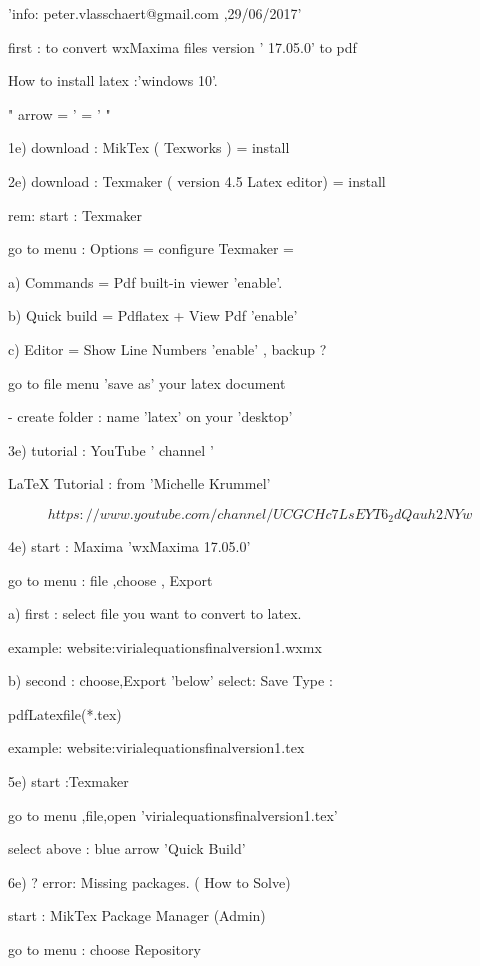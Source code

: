 \documentclass[12pt]{article}
\begin{document}
'info: peter.vlasschaert@gmail.com ,29/06/2017'

first : to convert wxMaxima files version ' 17.05.0' to pdf 

How to install latex :'windows 10'.

 "  arrow =  ' = '  "

1e) download : MikTex   ( Texworks ) = install

2e) download : Texmaker ( version 4.5 Latex editor) = install

rem: start : Texmaker  

     go to menu : Options = configure Texmaker = 
      
     a) Commands    = Pdf built-in viewer 'enable'.
     
     b) Quick build = Pdflatex + View Pdf 'enable'
     
     c) Editor      = Show Line Numbers   'enable' , backup ?

     go to file menu 'save as' your latex document
     
     - create folder : name 'latex' on your 'desktop'
     
3e) tutorial : YouTube   ' channel '

LaTeX Tutorial :   from  'Michelle Krummel'

 $$ https://www.youtube.com/channel/UCGCHc7LsEYT6_2dQauh2NYw $$   
 
4e) start : Maxima 'wxMaxima 17.05.0'

    go to menu : file ,choose , Export
    
    a) first : select file you want to convert to latex.
    
    example: website:virialequationsfinalversion1.wxmx
    
    b) second : choose,Export 'below' select: Save Type :
    
    pdfLatexfile(*.tex)
    
    example: website:virialequationsfinalversion1.tex
    
    
5e) start :Texmaker      

    go to menu ,file,open 'virialequationsfinalversion1.tex'
    
    select above : blue arrow 'Quick Build'
    
6e) ? error: Missing packages. ( How to Solve)

   start : MikTex Package Manager (Admin)
   
   go to menu : choose Repository
   
\end{document}
